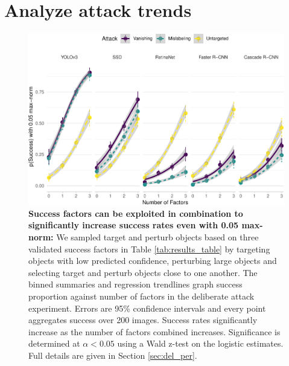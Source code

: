 \section{Analyze attack trends}\label{analyze-attack-trends}

\begin{figure}[tb]

{\centering \includegraphics[width=1\linewidth]{imgs/biased_trend_graph_normed} 

}

\caption{\textbf{Success factors can be exploited in combination to significantly increase success rates even with 0.05 max-norm:}  We sampled target and perturb objects based on three validated success factors in Table \ref{tab:results_table} by targeting objects with low predicted confidence, perturbing large objects and selecting target and perturb objects close to one another. The binned summaries and regression trendlines graph success proportion against number of factors in the deliberate attack experiment. Errors are 95\% confidence intervals and every point aggregates success over 200 images. Success rates significantly increase as the number of factors combined increases. Significance is determined at $\alpha < 0.05$ using a Wald z-test on the logistic estimates. Full details are given in Section \ref{sec:del_per}.}\label{fig:biased_trend_graph_normed}
\end{figure}

\begingroup\fontsize{9}{11}\selectfont

